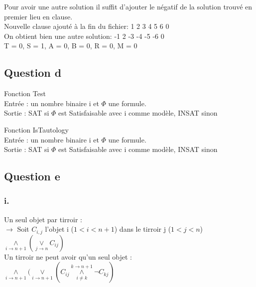 \documentclass[12pt]{report}
\begin{document}
\noindent Pour avoir une autre solution il suffit d'ajouter le négatif de la solution trouvé en premier lieu en clause. \\
Nouvelle clause ajouté à la fin du fichier:  1 2 3 4 5 6 0 \\
On obtient bien une autre solution: -1 2 -3 -4 -5 -6 0 \\
T = 0, S = 1, A = 0, B = 0, R = 0, M = 0 

\newpage
\subsection*{Question d}
\begin{algorithm}[H]
	Fonction Test \\
	Entrée : un nombre binaire i et $\Phi$ une formule. \\
	Sortie : SAT si $\Phi$ est Satisfaisable avec i comme modèle, INSAT sinon
\end{algorithm}

\begin{algorithm}[H]
	Fonction IsTautology \\
	Entrée : un nombre binaire i et $\Phi$ une formule. \\
	Sortie : SAT si $\Phi$ est Satisfaisable avec i comme modèle, INSAT sinon \\
\end{algorithm}

\subsection*{Question e}
\subsubsection*{i.}
Un seul objet par tirroir : \\
$\rightarrow$ Soit $C_{i,j}$ l'objet i ($1<i<n+1$) dans le tirroir j ($1 < j < n$) \\
$\underset{i \rightarrow n+1}{\land} (\underset{j \rightarrow n}{\lor} C_{ij})$ \\

\noindent Un tirroir ne peut avoir qu'un seul objet : \\
$\underset{i \rightarrow n+1}{\land} (\underset{i \rightarrow n+1}{\lor} (C_{ij} \overset{k \rightarrow n+1}{\underset{i \neq k}{\land}} \lnot C_{kj})$ \\
\end{document}
